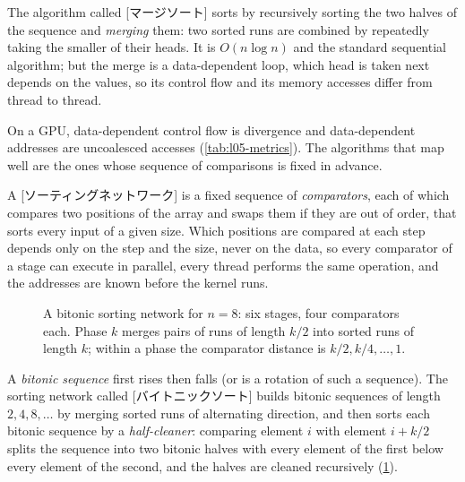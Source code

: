 \documentclass[../main.tex]{subfiles}
\begin{document}
\begin{definition}
  The algorithm called [マージソート] sorts by
  recursively sorting the two halves of the sequence and \emph{merging} them: two sorted runs are
  combined by repeatedly taking the smaller of their heads.  It is
  $O(n \log n)$ and the standard sequential algorithm; but the merge is a
  data-dependent loop, which head is taken next depends on the values,
  so its control flow and its memory accesses differ from thread to
  thread.
\end{definition}

On a GPU, data-dependent control flow is divergence and data-dependent
addresses are uncoalesced accesses (\cref{tab:l05-metrics}).  The
algorithms that map well are the ones whose sequence of comparisons is
fixed in advance.

\begin{definition}
  A [ソーティングネットワーク] is a fixed sequence of
  \emph{comparators}, each of which compares two positions of the array
  and swaps them if they are out of order, that sorts every input of a
  given size.  Which positions are compared at each step depends only on
  the step and the size, never on the data, so every comparator of a
  stage can execute in parallel, every thread performs the same
  operation, and the addresses are known before the kernel
  runs.
\end{definition}

\begin{figure}[tb]
  \centering
  
  \caption{A bitonic sorting network for $n = 8$: six stages, four
    comparators each.  Phase $k$ merges pairs of runs of length $k/2$ into sorted
    runs of length $k$; within a phase the comparator distance is $k/2, k/4, \ldots, 1$.}
  \label{fig:l05-bitonic}
\end{figure}

\begin{definition}
  A \emph{bitonic sequence} first rises then falls (or is a rotation of
  such a sequence).  The sorting network called
  [バイトニックソート] builds bitonic sequences of length $2, 4, 8, \ldots$ by
  merging sorted runs of alternating direction, and then sorts each
  bitonic sequence by a \emph{half-cleaner}: comparing element $i$ with
  element $i + k/2$ splits the sequence into two bitonic halves with
  every element of the first below every element of the second, and the
  halves are cleaned recursively (\cref{fig:l05-bitonic}).
\end{definition}
\end{document}
